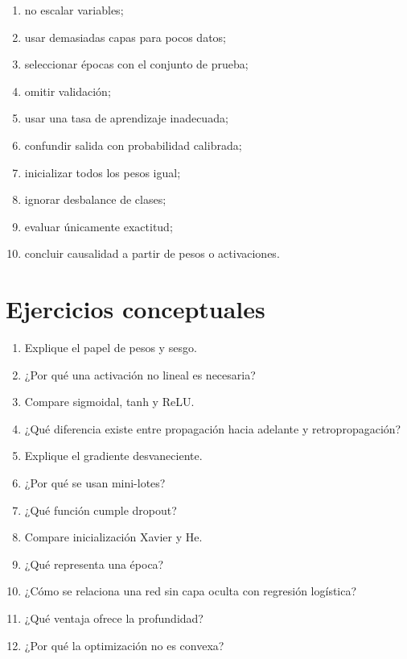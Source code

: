 \documentclass[
  spanish,
  10.5pt,
  letterpaper,
  DIV=11,
  numbers=noendperiod,
  oneside,
  open=any]{scrreprt}
\providecommand{\tightlist}{%
  \setlength{\itemsep}{0pt}\setlength{\parskip}{0pt}}
\theoremstyle{definition}
\theoremstyle{definition}
\theoremstyle{plain}
\theoremstyle{remark}
\begin{document}
\begin{enumerate}
\def\labelenumi{\arabic{enumi}.}
\tightlist
\item
  no escalar variables;
\item
  usar demasiadas capas para pocos datos;
\item
  seleccionar épocas con el conjunto de prueba;
\item
  omitir validación;
\item
  usar una tasa de aprendizaje inadecuada;
\item
  confundir salida con probabilidad calibrada;
\item
  inicializar todos los pesos igual;
\item
  ignorar desbalance de clases;
\item
  evaluar únicamente exactitud;
\item
  concluir causalidad a partir de pesos o activaciones.
\end{enumerate}

\section*{Ejercicios conceptuales}\label{ejercicios-conceptuales-14}


\begin{enumerate}
\def\labelenumi{\arabic{enumi}.}
\tightlist
\item
  Explique el papel de pesos y sesgo.
\item
  ¿Por qué una activación no lineal es necesaria?
\item
  Compare sigmoidal, tanh y ReLU.
\item
  ¿Qué diferencia existe entre propagación hacia adelante y
  retropropagación?
\item
  Explique el gradiente desvaneciente.
\item
  ¿Por qué se usan mini-lotes?
\item
  ¿Qué función cumple dropout?
\item
  Compare inicialización Xavier y He.
\item
  ¿Qué representa una época?
\item
  ¿Cómo se relaciona una red sin capa oculta con regresión logística?
\item
  ¿Qué ventaja ofrece la profundidad?
\item
  ¿Por qué la optimización no es convexa?
\end{enumerate}
\end{document}
